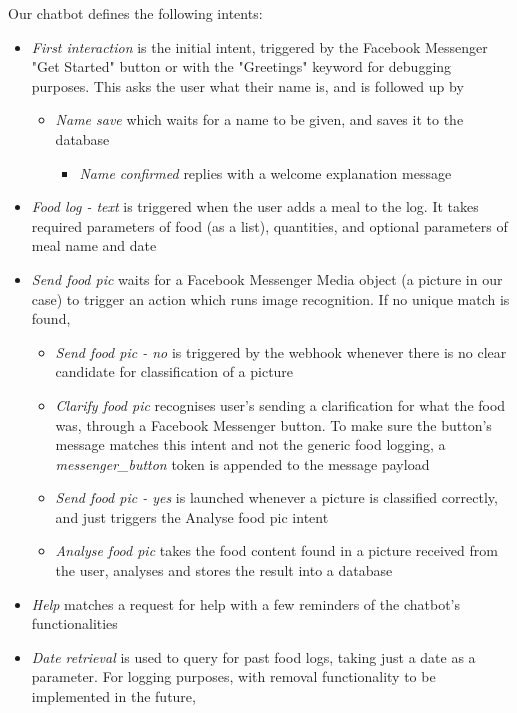 Our chatbot defines the following intents:
\begin{itemize}
  \item \textit{First interaction} is the initial intent, triggered by the Facebook Messenger "Get Started" button or with the "Greetings" keyword for debugging purposes. This asks the user what their name is, and is followed up by 
  \begin{itemize}
  	\item \textit{Name save} which waits for a name to be given, and saves it to the database
    \begin{itemize}
        \item \textit{Name confirmed} replies with a welcome explanation message
    \end{itemize}
  \end{itemize}
  \item \textit{Food log - text} is triggered when the user adds a meal to the log. It takes required parameters of food (as a list), quantities, and optional parameters of meal name and date
  \item \textit{Send food pic} waits for a Facebook Messenger Media object (a picture in our case) to trigger an action which runs image recognition. If no unique match is found, 
  \begin{itemize}
    \item \textit{Send food pic - no} is triggered by the webhook whenever there is no clear candidate for classification of a picture
    \item \textit{Clarify food pic} recognises user's sending a clarification for what the food was, through a Facebook Messenger button. To make sure the button's message matches this intent and not the generic food logging, a \textit{messenger\_button} token is appended to the message payload
  \end{itemize}
  \begin{itemize}
    \item \textit{Send food pic - yes} is launched whenever a picture is classified correctly, and just triggers the Analyse food pic intent
    \item \textit{Analyse food pic} takes the food content found in a picture received from the user, analyses and stores the result into a database
  \end{itemize}
  \item \textit{Help} matches a request for help with a few reminders of the chatbot's functionalities
  \item \textit{Date retrieval} is used to query for past food logs, taking just a date as a parameter. For logging purposes, with removal functionality to be implemented in the future,

\end{itemize}

